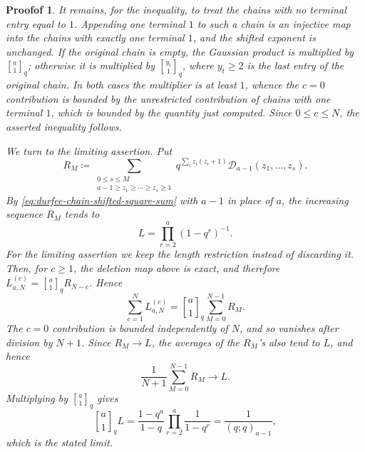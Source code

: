 \documentclass[10pt,a4paper]{amsart}
\newtheorem{proofof}{Proofof}
\renewcommand{\geq}{\geqslant}
\renewcommand{\leq}{\leqslant}
\newcommand{\qgauss}[2]{\genfrac{[}{]}{0pt}{}{#1}{#2}_q}
\begin{document}
\begin{proofof}
It remains, for the inequality, to treat the chains with no terminal entry equal
to $1$. Appending one terminal $1$ to such a chain is an injective map into
the chains with exactly one terminal $1$, and the shifted exponent is
unchanged. If the original chain is empty, the Gaussian product is multiplied by
$\qgauss{a}{1}$; otherwise it is multiplied by $\qgauss{y_t}{1}$, where
$y_t\geq 2$ is the last entry of the original chain. In both cases the
multiplier is at least $1$, whence the $c=0$ contribution is bounded by the
unrestricted contribution of chains with one terminal $1$, which is bounded by
the quantity just computed. Since $0\leq c\leq N$, the asserted inequality
follows.

We turn to the limiting assertion. Put
\[
        R_M\coloneqq
        \sum_{\substack{0\leq s\leq M\\ a-1\geq z_1\geq\cdots\geq z_s\geq 1}}
        q^{\sum_i z_i(z_i+1)}\mathcal D_{a-1}(z_1,\ldots,z_s).
\]
By \eqref{eq:durfee-chain-shifted-square-sum} with $a-1$ in place of $a$,
the increasing sequence $R_M$ tends to
\[
        L=\prod_{r=2}^a(1-q^r)^{-1}.
\]
For the limiting assertion we keep the length restriction instead of discarding
it. Then, for $c\geq 1$, the deletion map above is exact, and therefore
$L_{a,N}^{(c)}=\qgauss{a}{1}R_{N-c}$. Hence
\[
        \sum_{c=1}^N L_{a,N}^{(c)}
        =
        \qgauss{a}{1}\sum_{M=0}^{N-1}R_M.
\]
The $c=0$ contribution is bounded independently of $N$, and so vanishes
after division by $N+1$. 
Since $R_M\to L$, the averages of the $R_M$'s also tend to $L$, and hence
\[
        \frac{1}{N+1}\sum_{M=0}^{N-1}R_M \longrightarrow L.
\]
Multiplying by $\qgauss{a}{1}$ gives
\[
        \qgauss{a}{1}L
        =
        \frac{1-q^a}{1-q}\prod_{r=2}^a\frac{1}{1-q^r}
        =
        \frac{1}{(q;q)_{a-1}},
\]
which is the stated limit.
\end{proofof}
\end{document}
